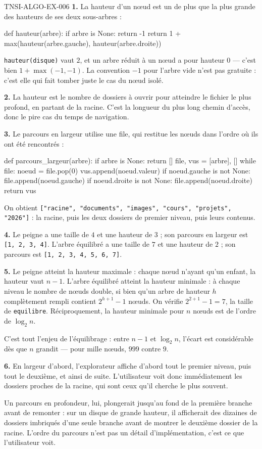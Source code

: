 \begin{corrige}{TNSI-ALGO-EX-006}
\textbf{1.} La hauteur d'un n\oe{}ud est un de plus que la plus grande des
hauteurs de ses deux sous-arbres :
\begin{python}
def hauteur(arbre):
    if arbre is None:
        return -1
    return 1 + max(hauteur(arbre.gauche), hauteur(arbre.droite))
\end{python}
\lstinline{hauteur(disque)} vaut $2$, et un arbre réduit à un n\oe{}ud a pour
hauteur $0$ — c'est bien $1+\max(-1,-1)$. La convention $-1$ pour l'arbre vide
n'est pas gratuite : c'est elle qui fait tomber juste le cas du n\oe{}ud isolé.

\textbf{2.} La hauteur est le nombre de dossiers à ouvrir pour atteindre le
fichier le plus profond, en partant de la racine. C'est la longueur du plus long
chemin d'accès, donc le pire cas du temps de navigation.

\textbf{3.} Le parcours en largeur utilise une file, qui restitue les n\oe{}uds
dans l'ordre où ils ont été rencontrés :
\begin{python}
def parcours_largeur(arbre):
    if arbre is None:
        return []
    file, vus = [arbre], []
    while file:
        noeud = file.pop(0)
        vus.append(noeud.valeur)
        if noeud.gauche is not None:
            file.append(noeud.gauche)
        if noeud.droite is not None:
            file.append(noeud.droite)
    return vus
\end{python}
On obtient
\lstinline{["racine", "documents", "images", "cours", "projets", "2026"]} : la
racine, puis les deux dossiers de premier niveau, puis leurs contenus.

\textbf{4.} Le peigne a une taille de $4$ et une hauteur de $3$ ; son parcours
en largeur est \lstinline{[1, 2, 3, 4]}. L'arbre équilibré a une taille de $7$ et
une hauteur de $2$ ; son parcours est \lstinline{[1, 2, 3, 4, 5, 6, 7]}.

\textbf{5.} Le peigne atteint la hauteur maximale : chaque n\oe{}ud n'ayant
qu'un enfant, la hauteur vaut $n-1$. L'arbre équilibré atteint la hauteur
minimale : à chaque niveau le nombre de n\oe{}uds double, si bien qu'un arbre de
hauteur $h$ complètement rempli contient $2^{h+1}-1$ n\oe{}uds. On vérifie
$2^{2+1}-1=7$, la taille de \lstinline{equilibre}. Réciproquement, la hauteur
minimale pour $n$ n\oe{}uds est de l'ordre de $\log_2 n$.

C'est tout l'enjeu de l'équilibrage : entre $n-1$ et $\log_2 n$, l'écart est
considérable dès que $n$ grandit — pour mille n\oe{}uds, $999$ contre $9$.

\textbf{6.} En largeur d'abord, l'explorateur affiche d'abord tout le premier
niveau, puis tout le deuxième, et ainsi de suite. L'utilisateur voit donc
immédiatement les dossiers proches de la racine, qui sont ceux qu'il cherche le
plus souvent.

Un parcours en profondeur, lui, plongerait jusqu'au fond de la première branche
avant de remonter : sur un disque de grande hauteur, il afficherait des dizaines
de dossiers imbriqués d'une seule branche avant de montrer le deuxième dossier de
la racine. L'ordre du parcours n'est pas un détail d'implémentation, c'est ce que
l'utilisateur voit.
\end{corrige}
